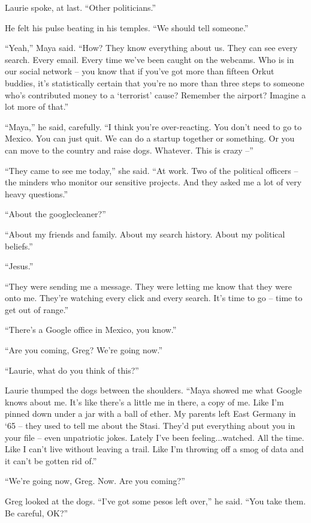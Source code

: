 Laurie spoke, at last. “Other politicians.”

He felt his pulse beating in his temples. “We should tell someone.”

“Yeah,” Maya said. “How? They know everything about us. They can 
see every search. Every email. Every time we've been caught on the 
webcams. Who is in our social network -- you know that if you've got 
more than fifteen Orkut buddies, it's statistically certain that you're 
no more than three steps to someone who's contributed money to a 
`terrorist' cause? Remember the airport? Imagine a lot more of that.”

“Maya,” he said, carefully. “I think you're over-reacting. You 
don't need to go to Mexico. You can just quit. We can do a startup 
together or something. Or you can move to the country and raise dogs. 
Whatever. This is crazy --”

“They came to see me today,” she said. “At work. Two of the 
political officers -- the minders who monitor our sensitive projects. 
And they asked me a lot of very heavy questions.”

“About the googlecleaner?”

“About my friends and family. About my search history. About my 
political beliefs.”

“Jesus.”

“They were sending me a message. They were letting me know that they 
were onto me. They're watching every click and every search. It's time 
to go -- time to get out of range.”

“There's a Google office in Mexico, you know.”

“Are you coming, Greg? We're going now.”

“Laurie, what do you think of this?”

Laurie thumped the dogs between the shoulders. “Maya showed me what 
Google knows about me. It's like there's a little me in there, a copy 
of me. Like I'm pinned down under a jar with a ball of ether. My 
parents left East Germany in `65 -- they used to tell me about the 
Stasi. They'd put everything about you in your file -- even unpatriotic 
jokes. Lately I've been feeling...watched. All the time. Like I can't 
live without leaving a trail. Like I'm throwing off a smog of data and 
it can't be gotten rid of.”

“We're going now, Greg. Now. Are you coming?”

Greg looked at the dogs. “I've got some pesos left over,” he said. 
“You take them. Be careful, OK?”


